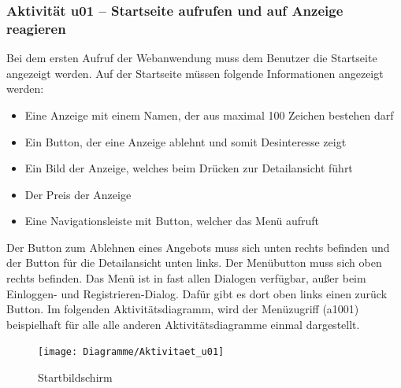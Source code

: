 \documentclass[a4paper,12pt,oneside]{scrartcl}
\begin{document}
%


\hypertarget{u01}{\subsubsection{Aktivität u01 – Startseite aufrufen und auf Anzeige reagieren}}
Bei dem ersten Aufruf der Webanwendung muss dem Benutzer die Startseite angezeigt werden.
Auf der Startseite müssen folgende Informationen angezeigt werden:
\begin{itemize}
	\item Eine Anzeige mit einem Namen, der aus maximal 100 Zeichen bestehen darf
	\item Ein Button, der eine Anzeige ablehnt und somit Desinteresse zeigt
	\item Ein Bild der Anzeige, welches beim Drücken zur Detailansicht führt
	\item Der Preis der Anzeige
	\item Eine Navigationsleiste mit Button, welcher das Menü aufruft
\end{itemize}

Der Button zum Ablehnen eines Angebots muss sich unten rechts befinden und der Button für die Detailansicht unten links.
Der Menübutton muss sich oben rechts befinden.
Das Menü ist in fast allen Dialogen verfügbar, außer beim
Einloggen- und Registrieren-Dialog. Dafür gibt es dort oben links einen zurück Button. Im folgenden Aktivitätsdiagramm, wird der Menüzugriff (a1001) beispielhaft für alle alle anderen Aktivitätsdiagramme einmal dargestellt.

\begin{figure}[!htbp]
\centering
\noindent\texttt{[image: Diagramme/Aktivitaet\_u01]}
\caption{Startbildschirm}
\end{figure}
\FloatBarrier
\end{document}

